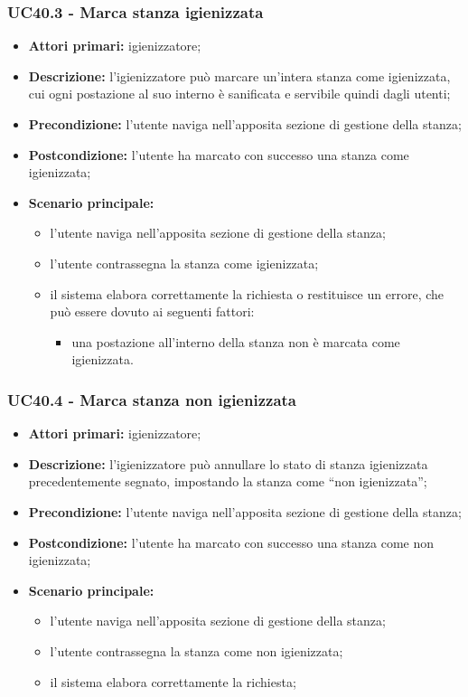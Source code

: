 \subsubsection{UC40.3 - Marca stanza igienizzata}

\begin{itemize}
\item \textbf{Attori primari:} igienizzatore;
\item \textbf{Descrizione:} l’igienizzatore può marcare un'intera stanza come igienizzata, cui ogni postazione al suo interno è sanificata e servibile quindi dagli utenti;
\item \textbf{Precondizione:} l'utente naviga nell’apposita sezione di gestione della stanza; 
\item \textbf{Postcondizione:} l'utente ha marcato con successo una stanza come igienizzata;
\item \textbf{Scenario principale:} 
	\begin{itemize}
		\item l’utente naviga nell’apposita sezione di gestione della stanza;	
		\item l'utente contrassegna la stanza come igienizzata;
		\item il sistema elabora correttamente la richiesta o restituisce un errore, che può essere dovuto ai seguenti fattori:
			\begin {itemize}
				\item una postazione all’interno della stanza non è marcata come igienizzata.
			\end{itemize}
		\end{itemize}
\end{itemize}

\subsubsection{UC40.4 - Marca stanza non igienizzata}

\begin{itemize}
\item \textbf{Attori primari:} igienizzatore;
\item \textbf{Descrizione:} l’igienizzatore può annullare lo stato di stanza igienizzata precedentemente segnato, impostando la stanza come “non igienizzata”;
\item \textbf{Precondizione:} l'utente naviga nell’apposita sezione di gestione della stanza; 
\item \textbf{Postcondizione:} l'utente ha marcato con successo una stanza come non igienizzata;
\item \textbf{Scenario principale:} 
	\begin{itemize}
		\item l’utente naviga nell’apposita sezione di gestione della stanza;	
		\item l'utente contrassegna la stanza come non igienizzata;
		\item il sistema elabora correttamente la richiesta;
	\end{itemize}
\end{itemize}

